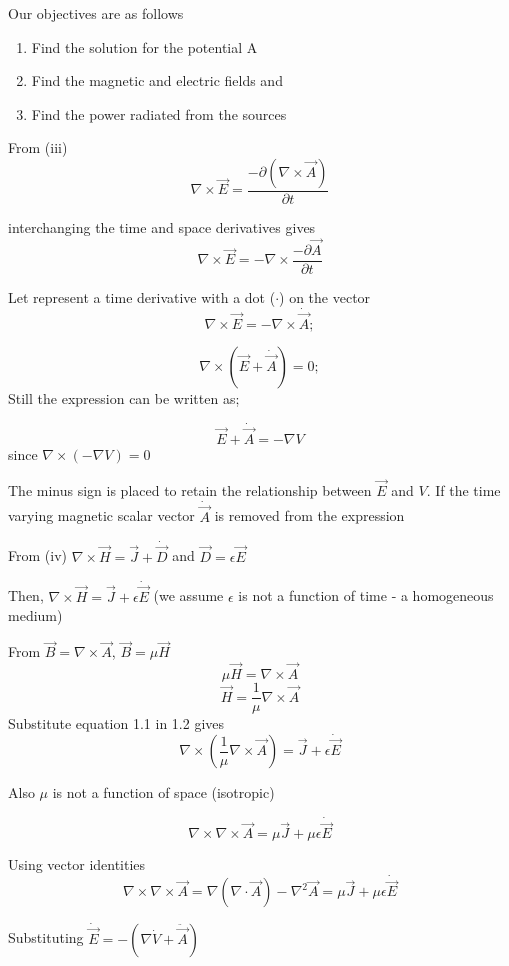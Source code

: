 Our objectives are as follows
\begin{enumerate}
\item Find the solution for the potential A
\item Find the magnetic and electric fields and
\item Find the power radiated from the sources
\end{enumerate}

From (iii) $$\nabla\times\vec{E}=\dfrac{-\partial(\nabla\times\vec{A})}{\partial t}$$

interchanging the time and space derivatives gives
$$\nabla\times\vec{E}=-\nabla\times\dfrac{-\partial\vec{A}}{\partial t}$$

Let represent a time derivative with a dot ($\cdot$) on the vector
$$\nabla\times\vec{E}=-\nabla\times\dot{\vec{A}};$$

$$\nabla\times(\vec{E}+\dot{\vec{A}})=0;$$ Still the expression can be written as;

$$\vec{E}+\dot{\vec{A}}= -\nabla V$$ since $\nabla\times(-\nabla V)=0$

The minus sign is placed to retain the relationship between $\vec{E}$ and $V$. If the time varying magnetic scalar vector $\dot{\vec{A}}$ is removed from the expression

From (iv)
$\nabla\times\vec{H}=\vec{J}+\dot{\vec{D}}$
and $\vec{D}=\epsilon\vec{E}$

Then, $\nabla\times\vec{H}=\vec{J}+\epsilon\dot{\vec{E}}$ (we assume $\epsilon$ is not a function of time - a homogeneous medium)

From $\vec{B}=\nabla\times\vec{A}$, $\vec{B}=\mu\vec{H}$
\begin{equation}
\mu\vec{H}=\nabla\times\vec{A}
\end{equation}
\begin{equation}
\vec{H}=\dfrac{1}{\mu}\nabla\times\vec{A}
\end{equation}
Substitute equation 1.1 in 1.2 gives $$\nabla\times(\dfrac{1}{\mu}\nabla\times\vec{A})=\vec{J}+\epsilon\dot{\vec{E}}$$

Also $\mu$ is not a function of space (isotropic)

$$\nabla\times\nabla\times\vec{A}=\mu\vec{J}+\mu\epsilon\dot{\vec{E}}$$ 

Using vector identities
$$\nabla\times\nabla\times\vec{A}= \nabla(\nabla\cdot\vec{A}) -\nabla^{2}\vec{A}=\mu\vec{J}+\mu\epsilon\dot{\vec{E}}$$

Substituting $\dot{\vec{E}}=-(\nabla\dot{V}+\ddot{\vec{A}})$

